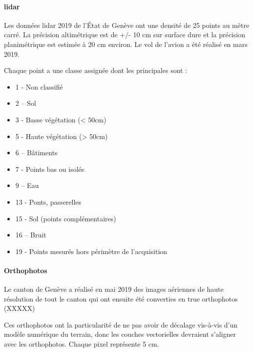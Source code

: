 \paragraph{\gls{lidar}}

\par{Les données \gls{lidar} 2019 \cite{sitg_nuages_2019} de l'État de Genève ont une densité de 25 points au mètre carré. La précision altimétrique est de +/- 10 cm sur surface dure et la précision planimétrique est estimée à 20 cm environ. Le vol de l'avion a été réalisé en mars 2019.}

Chaque point a une classe assignée dont les principales sont :
\begin{itemize}
    \item 1 - Non classifié
    \item 2 – Sol
    \item 3 - Basse végétation (< 50cm)
    \item 5 - Haute végétation (> 50cm)
    \item 6 – Bâtiments
    \item 7 - Points bas ou isolés
    \item 9 – Eau
    \item 13 - Ponts, passerelles
    \item 15 - Sol (points complémentaires)
    \item 16 – Bruit
    \item 19 - Points mesurés hors périmètre de l'acquisition
\end{itemize}

\paragraph{Orthophotos}
\par{Le canton de Genève a réalisé en mai 2019 des images aériennes de haute résolution \cite{sitg_orthophotos_nodate} de tout le canton qui ont ensuite été converties en true orthophotos (XXXXX)}
\par{Ces orthophotos ont la particularité de ne pas avoir de décalage vis-à-vis d'un modèle numérique du terrain, donc les couches vectorielles devraient s'aligner avec les orthophotos. Chaque pixel représente 5 cm.}

